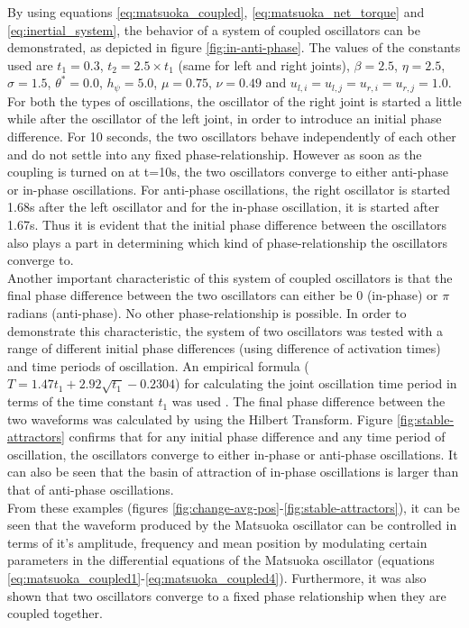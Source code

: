 \documentclass[12pt,twoside]{article}
\theoremstyle{plain}
\theoremstyle{definition}
\theoremstyle{remark}
\newcommand{\forceindent}{\leavevmode{\parindent=2em\indent}}
\begin{document}
\forceindent By using equations \ref{eq:matsuoka_coupled}, \ref{eq:matsuoka_net_torque} and  \ref{eq:inertial_system}, the behavior of a system of coupled oscillators can be demonstrated, as depicted in figure \ref{fig:in-anti-phase}. The values of the constants used are $t_1=0.3$, $t_2= 2.5 \times t_1$ (same for left and right joints), $\beta=2.5$,  $\eta=2.5$, $\sigma=1.5$, $\theta^*=0.0$, $h_{\psi}=5.0$, $\mu=0.75$, $\nu=0.49$ and $u_{l,i}=u_{l,j}=u_{r,i}=u_{r,j}=1.0$. For both the types of oscillations, the oscillator of the right joint is started a little while after the oscillator of the left joint, in order to introduce an initial phase difference. For 10 seconds, the two oscillators behave independently of each other and do not settle into any fixed phase-relationship. However as soon as the coupling is turned on at t=10s, the two oscillators converge to either anti-phase or in-phase oscillations. For anti-phase oscillations, the right oscillator is started 1.68s after the left oscillator and for the in-phase oscillation, it is started after 1.67s. Thus it is evident that the initial phase difference between the oscillators also plays a part in determining which kind of phase-relationship the oscillators converge to.\\
\forceindent Another important characteristic of this system of coupled oscillators is that the final phase difference between the two oscillators can either be 0 (in-phase) or $\pi$ radians (anti-phase). No other phase-relationship is possible. In order to demonstrate this characteristic, the system of two oscillators was tested with a range of different initial phase differences (using difference of activation times) and time periods of oscillation. An empirical formula ($T=1.47t_1 + 2.92\sqrt{t_1} - 0.2304$) for calculating the joint oscillation time period in terms of the time constant $t_1$ was used \cite{Ronsse2009}. The final phase difference between the two waveforms was calculated by using the Hilbert Transform. Figure \ref{fig:stable-attractors} confirms that for any initial phase difference and any time period of oscillation, the oscillators converge to either in-phase or anti-phase oscillations. It can also be seen that the basin of attraction of in-phase oscillations is larger than that of anti-phase oscillations.\\
\forceindent From these examples (figures \ref{fig:change-avg-pos}-\ref{fig:stable-attractors}), it can be seen that the waveform produced by the Matsuoka oscillator can be controlled in terms of it's amplitude, frequency and mean position by modulating certain parameters in the differential equations of the Matsuoka oscillator (equations \ref{eq:matsuoka_coupled1}-\ref{eq:matsuoka_coupled4}). Furthermore, it was also shown that two oscillators converge to a fixed phase relationship when they are coupled together.
\end{document}
